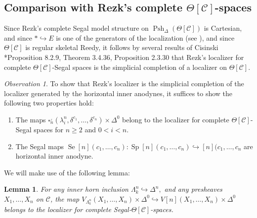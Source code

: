\documentclass[leqno]{article}
\numberwithin{equation}{subsection}
\theoremstyle{plain}   %
\newtheorem{lemma}[equation]{Lemma}
\theoremstyle{remark}
\newtheorem{obs}[equation]{Observation}
\theoremstyle{plain}
\DeclareMathOperator{\Psh}{Psh}
\newcommand{\C}{\ensuremath{\mathcal{C}}}
\begin{document}
\subsection{Comparison with Rezk's complete \(\Theta[\C]\)-spaces}\label{rezkcomparison}
Since Rezk's complete Segal model structure on \(\Psh_\Delta(\Theta[\C])\) is Cartesian, and since \(\ast \hookrightarrow E\) is one of the generators of the localization (see \cite{rezk-theta-n-spaces}), and since \(\Theta[\C]\) is regular skeletal Reedy, it follows by several results of Cisinski \cite{cisinski-book}*{Proposition 8.2.9, Theorem 3.4.36, Proposition 2.3.30} that Rezk's localizer for complete \(\Theta[\C]\)-Segal spaces is the simplicial completion of a localizer on \(\Theta[\C]\).  
\begin{obs}
	To show that Rezk's localizer is the simplicial completion of the localizer generated by the horizontal inner anodynes, it suffices to show the following two properties hold:
	\begin{enumerate}[\indent (i)] 
		\item The maps 
		\(\square_n^\lrcorner(\lambda^n_i,\delta^{c_1},\dots,\delta^{c_n})\times \Delta^0\) belong to the localizer for complete \(\Theta[\C]\)-Segal spaces for \(n\geq 2\) and \(0<i<n\).
		\item The Segal maps \(\operatorname{Se}[n](c_1,\dots,c_n): \operatorname{Sp}[n](c_1,\dots,c_n) \hookrightarrow [n](c_1,\dots,c_n\) are horizontal inner anodyne.
	\end{enumerate}
\end{obs}
We will make use of the following lemma:
\begin{lemma}\label{precatproperty}
	For any inner horn inclusion \(\Lambda^n_k\hookrightarrow \Delta^n,\) and any presheaves \(X_1,\dots,X_n\) on \(\C\), the map \(V_{\Lambda^n_k}(X_1,\dots,X_n)\times \Delta^0 \hookrightarrow V[n](X_1,\dots,X_n)\times \Delta^0\) belongs to the localizer for complete Segal-\(\Theta[\C]\)-spaces.
\end{lemma}
\end{document}
